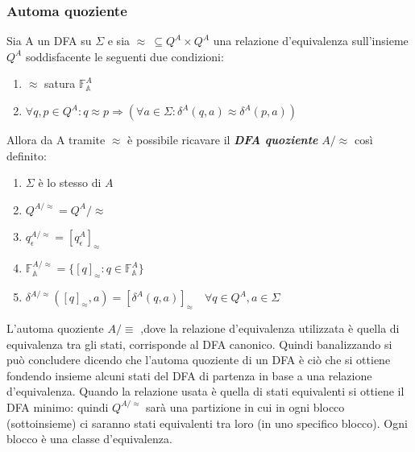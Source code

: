\subsubsection{Automa quoziente}
\label{subsub:aqu}
Sia A un \ac{DFA} su $\Sigma$ e sia  $\approx \: \subseteq Q^{A}\!\!\times{}\!Q^{A}$ una relazione d'equivalenza sull'insieme $Q^{A}$ soddisfacente le seguenti due condizioni:
\begin{enumerate}[label=(\roman*)]
\item $\approx$ satura $\mathbb{F}_{\mathbb{A}}^{A}$
\item $\forall q,p \in Q^{A} : q \approx p \Rightarrow (\forall a \in \Sigma : \delta^{A}(q,a) \approx \delta^{A}(p,a) )$ 
\end{enumerate}
Allora da A tramite $\approx$ è possibile ricavare il \textit{\textbf{DFA quoziente}} \textbf{$A/\!\!\approx$} così definito:
\begin{enumerate}
\item $\Sigma$ è lo stesso di $A$
\item $Q^{A/\!\approx} = Q^{A}/\!\!\approx$
\item $q_\epsilon^{A/\!\approx} = [q_\epsilon^{A}]_\approx$
\item $\mathbb{F}_\mathbb{A}^{A/\!\approx} = \{[q]_\approx : q \in \mathbb{F}_\mathbb{A}^{A}\}$
\item $\delta^{A/\!\approx}([q]_\approx,a) = [\delta^{A}(q,a)]_\approx \quad \forall q \in Q^{A},a\in{\Sigma}$
\end{enumerate}
L'automa quoziente $A/\!\!\equiv$ ,dove la relazione d'equivalenza utilizzata è quella di equivalenza tra gli stati, corrisponde al \ac{DFA} canonico. Quindi banalizzando si può concludere dicendo che l'automa quoziente di un \ac{DFA} è ciò che si ottiene fondendo insieme alcuni stati del \ac{DFA} di partenza in base a una relazione d'equivalenza. Quando la relazione usata è quella di stati equivalenti si ottiene il DFA minimo: quindi $Q^{A/\!\approx}$ sarà una partizione in cui in ogni blocco (sottoinsieme) ci saranno stati equivalenti tra loro (in uno specifico blocco). Ogni blocco è una classe d'equivalenza.

